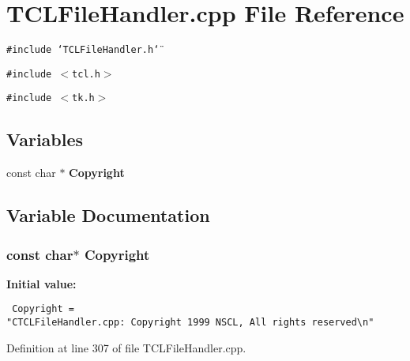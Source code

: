 \section{TCLFile\-Handler.cpp File Reference}
\label{TCLFileHandler_8cpp}
{\tt \#include \char`\"{}TCLFile\-Handler.h\char`\"{}}\par
{\tt \#include $<$tcl.h$>$}\par
{\tt \#include $<$tk.h$>$}\par
\subsection*{Variables}
\begin{CompactItemize}
\item 
const char $\ast$ {\bf Copyright}
\end{CompactItemize}


\subsection{Variable Documentation}
\subsubsection{\setlength{\rightskip}{0pt plus 5cm}const char$\ast$ Copyright\hspace{0.3cm}{\tt  [static]}}\label{TCLFileHandler_8cpp_a0}


{\bf Initial value:}

\footnotesize\begin{verbatim} Copyright = 
"CTCLFileHandler.cpp: Copyright 1999 NSCL, All rights reserved\n"\end{verbatim}\normalsize 


Definition at line 307 of file TCLFile\-Handler.cpp.